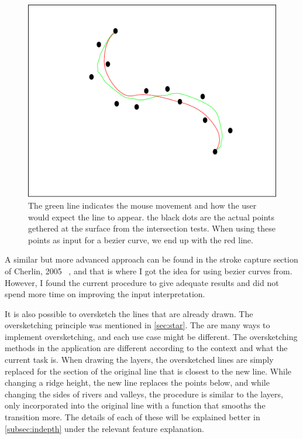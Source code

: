 \documentclass[a4paper,12pt]{report}
\newcommand{\secref}[1]{\autoref{#1}}
\begin{document}
\begin{figure}
 \includegraphics[width=\linewidth]{thesis/bezierSmooth.pdf}
 \caption{The green line indicates the mouse movement and how the user would expect the line to appear. the black dots are the actual points gethered at the surface from the intersection tests. When using these points as input for a bezier curve, we end up with the red line.}
 \label{fig:bezierSmooth}
\end{figure}


A similar but more advanced approach can be found in the stroke capture section of Cherlin, 2005 ~\cite{Cherlin:2005:SMF:1090122.1090145}, and that is where I got the idea for using bezier curves from. However, I found the current procedure to give adequate results and did not spend more time on improving the input interpretation.

It is also possible to oversketch the lines that are already drawn. The oversketching principle was mentioned in \ref{sec:star}. The are many ways to implement oversketching, and each use case might be different. The oversketching methods in the application are different according to the context and what the current task is. When drawing the layers, the oversketched lines are simply replaced for the section of the original line that is closest to the new line. While changing a ridge height, the new line replaces the points below, and while changing the sides of rivers and valleys, the procedure is similar to the layers, only incorporated into the original line with a function that smooths the transition more. The details of each of these will be explained better in \secref{subsec:indepth} under the relevant feature explanation.
\end{document}
